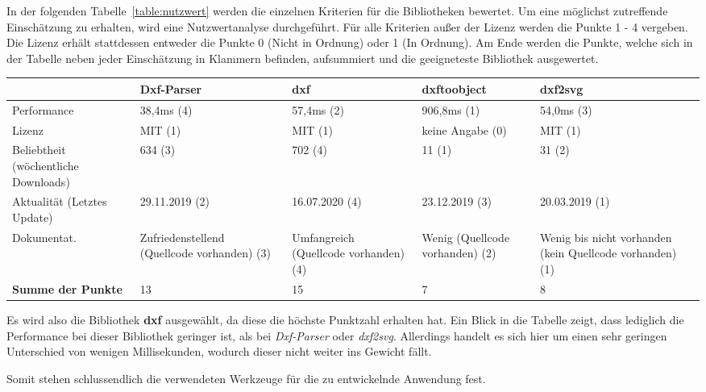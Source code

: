 In der folgenden Tabelle~\ref{table:nutzwert} werden die einzelnen Kriterien für die Bibliotheken bewertet.
Um eine möglichst zutreffende Einschätzung zu erhalten, wird eine Nutzwertanalyse durchgeführt.
Für alle Kriterien außer der Lizenz werden die Punkte 1 - 4 vergeben.
Die Lizenz erhält stattdessen entweder die Punkte 0 (Nicht in Ordnung) oder 1 (In Ordnung).
Am Ende werden die Punkte, welche sich in der Tabelle neben jeder Einschätzung in Klammern befinden, aufsummiert und die geeigneteste Bibliothek ausgewertet.

\begin{center}
    \scriptsize
    \begin{supertabular}{ p{1.4cm}|p{1.6cm}|p{1.5cm}|p{1.3cm}|p{1.3cm} }
        \label{table:nutzwert}
        & \textbf{Dxf-Parser} & \textbf{dxf} & \textbf{dxftoobject} & \textbf{dxf2svg} \\
        \hline
        Performance & 38,4ms (4) & 57,4ms (2) & 906,8ms (1) & 54,0ms (3) \\
        Lizenz & MIT (1) & MIT (1) & keine Angabe (0) & MIT (1) \\
        Beliebtheit (wöchentliche Downloads) & 634 (3) & 702 (4) & 11 (1) & 31 (2) \\
        Aktualität (Letztes Update) & 29.11.2019 (2) & 16.07.2020 (4) & 23.12.2019 (3) & 20.03.2019 (1) \\
        Dokumentat. & Zufriedenstellend (Quellcode vorhanden) (3) & Umfangreich (Quellcode vorhanden) (4) & Wenig (Quellcode vorhanden) (2) & Wenig bis nicht vorhanden (kein Quellcode vorhanden) (1) \\
        \hline
        \textbf{Summe der Punkte} & 13 & 15 & 7 & 8 \\
    \end{supertabular}
\end{center}

Es wird also die Bibliothek \textbf{dxf} ausgewählt, da diese die höchste Punktzahl erhalten hat.
Ein Blick in die Tabelle zeigt, dass lediglich die Performance bei dieser Bibliothek geringer ist, als bei \textit{Dxf-Parser} oder \textit{dxf2svg}.
Allerdings handelt es sich hier um einen sehr geringen Unterschied von wenigen Millisekunden, wodurch dieser nicht weiter ins Gewicht fällt.

Somit stehen schlussendlich die verwendeten Werkzeuge für die zu entwickelnde Anwendung fest.

